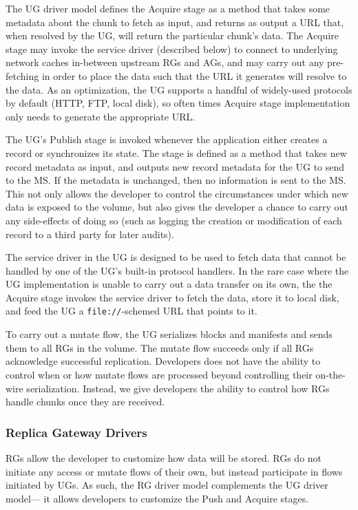 The UG driver model defines the Acquire stage as a method that takes some
metadata about the chunk to fetch as input, and returns as output a
URL that, when resolved by the UG, will return the particular chunk's data.
The Acquire stage may invoke the service driver (described below) to connect to
underlying network caches in-between upstream RGs and AGs, and may carry out any
pre-fetching in order to place the data such that the URL it generates will
resolve to the data.  As an optimization, the
UG supports a handful of widely-used protocols by default (HTTP, FTP, local
disk), so often times Acquire stage implementation only needs to
generate the appropriate URL.

The UG's Publish stage is invoked whenever the application either creates a
record or synchronizes its state.  The stage is defined as a
method that takes new record metadata as input, and outputs new record metadata for the UG to
send to the MS.  If the metadata is unchanged, then no information is sent to
the MS.  This not only allows the developer to control the circumstances under which
new data is exposed to the volume, but also gives the developer a chance to
carry out any side-effects of doing so (such as logging the creation or
modification of each record to a third party for later audits).

  The service driver in the UG is designed to
be used to fetch data that cannot be handled by one of the UG's built-in
protocol handlers.  In the rare case where the UG implementation is unable to carry out
a data transfer on its own, the the Acquire stage 
invokes the service driver to fetch the data, store it to local disk, and feed the UG a
\texttt{file://}-schemed URL that points to it.

To carry out a mutate flow, the UG serializes blocks and manifests and sends them to all RGs
in the volume.  The mutate flow succeeds only if all RGs
acknowledge successful replication.  Developers does not have the ability to
control when or how mutate flows are processed beyond controlling their
on-the-wire serialization.  Instead, we give developers the
ability to control how RGs handle chunks once they are received.

\subsubsection{Replica Gateway Drivers}

RGs allow the developer to customize how data will be stored.  RGs do not
initiate any access or mutate flows of their own, but instead participate in
flows initiated by UGs.  As such, the RG driver model complements the UG driver model---
it allows developers to customize the Push and Acquire stages.

